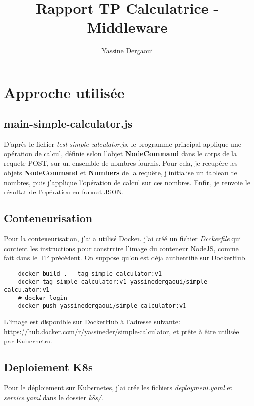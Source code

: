 \documentclass{article}
\title{Rapport TP Calculatrice - Middleware}
\author{Yassine Dergaoui}
\date{}
\begin{document}
\maketitle

\section{Approche utilisée}

\subsection{main-simple-calculator.js}
D'après le fichier \textit{test-simple-calculator.js}, le programme principal applique une opération de calcul, définie selon l'objet \textbf{NodeCommand} 
dans le corps de la requete POST, sur un ensemble de nombres fournis.
Pour cela, je recupère les objets \textbf{NodeCommand} et \textbf{Numbers} de la requête, j'initialise un tableau de nombres, puis j'applique l'opération de calcul sur ces nombres.
Enfin, je renvoie le résultat de l'opération en format JSON.

\subsection{Conteneurisation}
Pour la conteneurisation, j'ai a utilisé Docker. 
j'ai créé un fichier \textit{Dockerfile} qui contient les instructions pour construire l'image du conteneur NodeJS, comme fait dans le TP précédent.
On suppose qu'on est déjà authentifié sur DockerHub.

\begin{verbatim}
    docker build . --tag simple-calculator:v1
    docker tag simple-calculator:v1 yassinedergaoui/simple-calculator:v1
    # docker login
    docker push yassinedergaoui/simple-calculator:v1
\end{verbatim}

L'image est disponible sur DockerHub à l'adresse suivante: \href{https://hub.docker.com/r/yassineder/simple-calculator}{https://hub.docker.com/r/yassineder/simple-calculator}, et prête à être utilisée par Kubernetes.

\subsection{Deploiement K8s}
Pour le déploiement sur Kubernetes, j'ai crée les fichiers \textit{deployment.yaml} et \textit{service.yaml} dans le dossier \textit{k8s/}.\\
\end{document}
